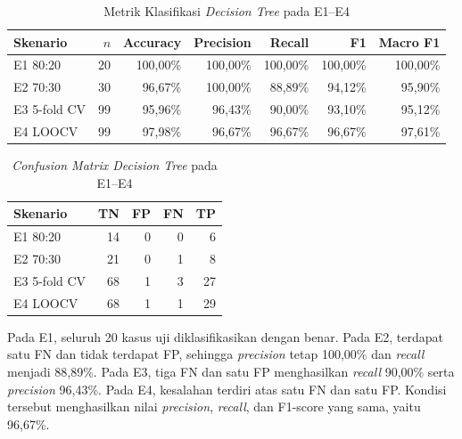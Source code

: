 \begin{table}[htbp]
    \centering
    \caption{Metrik Klasifikasi \textit{Decision Tree} pada E1--E4}
    \label{tab:metrik-decision-tree}
    \scriptsize
    \setlength{\tabcolsep}{4pt}
    \renewcommand{\arraystretch}{1.2}
    \begin{tabular}{lrrrrrr}
        \toprule
        \textbf{Skenario} & \textbf{$n$} & \textbf{Accuracy} & \textbf{Precision} & \textbf{Recall} & \textbf{F1} & \textbf{Macro F1} \\
        \midrule
        E1 80:20 & 20 & 100,00\% & 100,00\% & 100,00\% & 100,00\% & 100,00\% \\
        E2 70:30 & 30 & 96,67\% & 100,00\% & 88,89\% & 94,12\% & 95,90\% \\
        E3 5-fold CV & 99 & 95,96\% & 96,43\% & 90,00\% & 93,10\% & 95,12\% \\
        E4 LOOCV & 99 & 97,98\% & 96,67\% & 96,67\% & 96,67\% & 97,61\% \\
        \bottomrule
    \end{tabular}
\end{table}

\begin{table}[htbp]
    \centering
    \caption{\textit{Confusion Matrix Decision Tree} pada E1--E4}
    \label{tab:confusion-matrix-decision-tree}
    \small
    \renewcommand{\arraystretch}{1.2}
    \begin{tabular}{lrrrr}
        \toprule
        \textbf{Skenario} & \textbf{TN} & \textbf{FP} & \textbf{FN} & \textbf{TP} \\
        \midrule
        E1 80:20 & 14 & 0 & 0 & 6 \\
        E2 70:30 & 21 & 0 & 1 & 8 \\
        E3 5-fold CV & 68 & 1 & 3 & 27 \\
        E4 LOOCV & 68 & 1 & 1 & 29 \\
        \bottomrule
    \end{tabular}
\end{table}

Pada E1, seluruh 20 kasus uji diklasifikasikan dengan benar. Pada E2, terdapat satu FN dan tidak terdapat FP, sehingga \textit{precision} tetap 100,00\% dan \textit{recall} menjadi 88,89\%. Pada E3, tiga FN dan satu FP menghasilkan \textit{recall} 90,00\% serta \textit{precision} 96,43\%. Pada E4, kesalahan terdiri atas satu FN dan satu FP. Kondisi tersebut menghasilkan nilai \textit{precision}, \textit{recall}, dan F1-score yang sama, yaitu 96,67\%.

